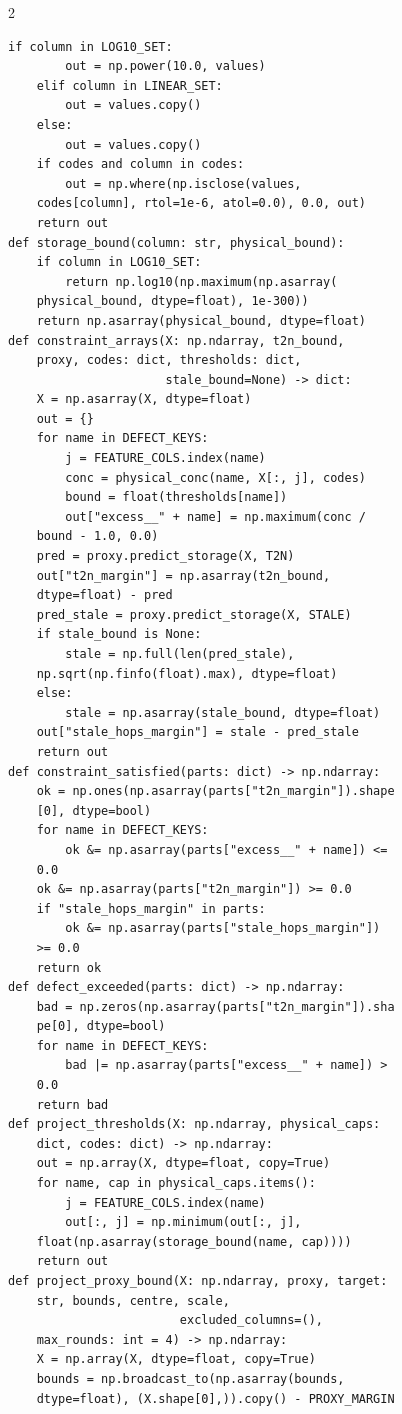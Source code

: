 \begin{multicols}{2}
\begin{Verbatim}[fontsize=\scriptsize]
    if column in LOG10_SET:
        out = np.power(10.0, values)
    elif column in LINEAR_SET:
        out = values.copy()
    else:
        out = values.copy()
    if codes and column in codes:
        out = np.where(np.isclose(values,
    codes[column], rtol=1e-6, atol=0.0), 0.0, out)
    return out
def storage_bound(column: str, physical_bound):
    if column in LOG10_SET:
        return np.log10(np.maximum(np.asarray(
    physical_bound, dtype=float), 1e-300))
    return np.asarray(physical_bound, dtype=float)
def constraint_arrays(X: np.ndarray, t2n_bound,
    proxy, codes: dict, thresholds: dict,
                      stale_bound=None) -> dict:
    X = np.asarray(X, dtype=float)
    out = {}
    for name in DEFECT_KEYS:
        j = FEATURE_COLS.index(name)
        conc = physical_conc(name, X[:, j], codes)
        bound = float(thresholds[name])
        out["excess__" + name] = np.maximum(conc /
    bound - 1.0, 0.0)
    pred = proxy.predict_storage(X, T2N)
    out["t2n_margin"] = np.asarray(t2n_bound,
    dtype=float) - pred
    pred_stale = proxy.predict_storage(X, STALE)
    if stale_bound is None:
        stale = np.full(len(pred_stale),
    np.sqrt(np.finfo(float).max), dtype=float)
    else:
        stale = np.asarray(stale_bound, dtype=float)
    out["stale_hops_margin"] = stale - pred_stale
    return out
def constraint_satisfied(parts: dict) -> np.ndarray:
    ok = np.ones(np.asarray(parts["t2n_margin"]).shape
    [0], dtype=bool)
    for name in DEFECT_KEYS:
        ok &= np.asarray(parts["excess__" + name]) <=
    0.0
    ok &= np.asarray(parts["t2n_margin"]) >= 0.0
    if "stale_hops_margin" in parts:
        ok &= np.asarray(parts["stale_hops_margin"])
    >= 0.0
    return ok
def defect_exceeded(parts: dict) -> np.ndarray:
    bad = np.zeros(np.asarray(parts["t2n_margin"]).sha
    pe[0], dtype=bool)
    for name in DEFECT_KEYS:
        bad |= np.asarray(parts["excess__" + name]) >
    0.0
    return bad
def project_thresholds(X: np.ndarray, physical_caps:
    dict, codes: dict) -> np.ndarray:
    out = np.array(X, dtype=float, copy=True)
    for name, cap in physical_caps.items():
        j = FEATURE_COLS.index(name)
        out[:, j] = np.minimum(out[:, j],
    float(np.asarray(storage_bound(name, cap))))
    return out
def project_proxy_bound(X: np.ndarray, proxy, target:
    str, bounds, centre, scale,
                        excluded_columns=(),
    max_rounds: int = 4) -> np.ndarray:
    X = np.array(X, dtype=float, copy=True)
    bounds = np.broadcast_to(np.asarray(bounds,
    dtype=float), (X.shape[0],)).copy() - PROXY_MARGIN

\end{Verbatim}
\end{multicols}
